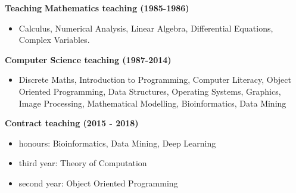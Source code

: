 \begin{description}
\begin{description}
\newpage
\item[] {\large \bf Teaching}\newline
\newline
{\large \bf Mathematics teaching (1985-1986)}

 \begin{itemize} 
  \item[] Calculus, Numerical Analysis, Linear Algebra, \newline
       Differential Equations, Complex Variables.
 \end{itemize}

{\large \bf  Computer Science teaching (1987-2014)}
\begin{itemize}
\item[]  Discrete Maths, Introduction to Programming, Computer Literacy, \newline
             Object Oriented Programming, Data Structures, \newline
             Operating Systems, Graphics, \newline
             Image Processing, Mathematical Modelling, \newline
             Bioinformatics, Data Mining
\end{itemize}


{\large \bf Contract teaching (2015 - 2018)}
\begin{itemize}
	\item[] honours: Bioinformatics, Data Mining, Deep Learning
	\item[] third year: Theory of Computation
	\item[] second year: Object Oriented Programming
\end{itemize}



\end{description}
\end{description}
\label{f0}
